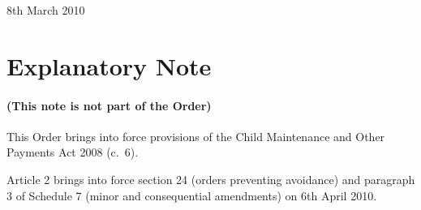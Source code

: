 \documentclass[12pt,a4paper]{article}
\begin{document}
8th March 2010

\small

\part{Explanatory Note}

\renewcommand\parthead{— Explanatory Note}

\subsection*{(This note is not part of the Order)}

This Order brings into force provisions of the Child Maintenance and Other Payments Act 2008 (c.~6).

Article 2 brings into force section 24 (orders preventing avoidance) and paragraph 3 of Schedule 7 (minor and consequential amendments) on 6th April 2010. 
\end{document}
